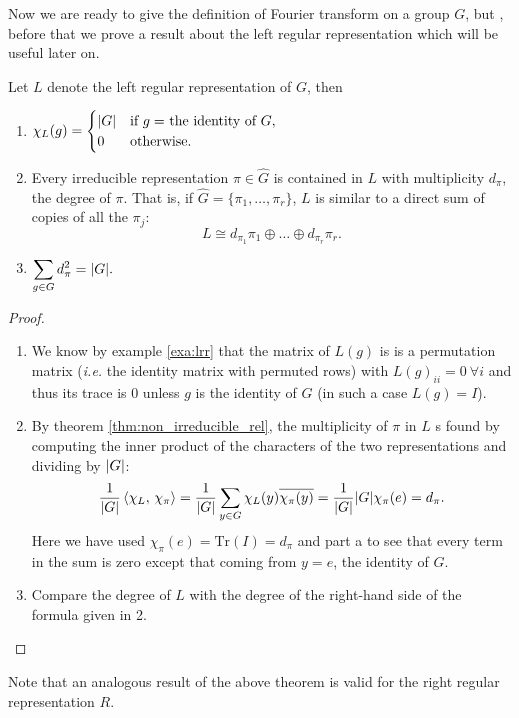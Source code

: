 Now we are ready to give the definition of Fourier transform on a group $G$, but , before that we prove a result about the left regular representation which will be useful later on.
\begin{lemma}
\label{lemma:lrr}
Let $L$ denote the left regular representation of $G$, then
\begin{enumerate}
\item $\displaystyle
\chi_{L}(g)=
\begin{cases}
\lvert G\rvert &\text{if $g=$ the identity of $G$},\\
0	   &\text{otherwise}.
\end{cases}
$
\item Every irreducible representation $\pi \in \hat{G}$ is contained in $L$ with multiplicity $d_\pi$, the degree of $\pi$. That is, if $\hat{G}=\{\pi_1,\dots ,\pi_r\}$, $L$ is similar to a direct sum of copies of all the  $\pi_j$:
\[
L\cong d_{\pi_1}\pi_1\oplus\dots\oplus d_{\pi_r}\pi_r.
\]
\item $\displaystyle\sum_{g\in G}d_{\pi}^2=\lvert G\rvert.$	
\end{enumerate}
\end{lemma}  
\begin{proof}
\begin{enumerate}
\item We know by example \ref{exa:lrr} that the matrix of $L(g)$ is  is a permutation matrix (\emph{i.e.} the identity matrix with permuted rows) with $L(g)_{ii}=0 \ \forall i$ and thus its trace is 0 unless $g$ is the identity of $G$ (in such a case $L(g)=I$).
\item By theorem \ref{thm:non_irreducible_rel}, the multiplicity of $\pi$ in $L$ s found by computing the inner product  of  the  characters  of  the  two  representations  and  dividing  by $\lvert G\rvert$:
\[
\frac{1}{\lvert G\rvert}\braket{\chi_L,\, \chi_\pi}=\frac{1}{\lvert G\rvert}\sum_{y \in G}\chi_L(y) \overline{\chi_\pi(y)}=\frac{1}{\lvert G\rvert}\lvert G\rvert \chi_\pi(e)=d_\pi.
\]
Here we have used $\chi_\pi(e)=\text{Tr$(I)=d_\pi$}$ and  part  a to  see that  every  term  in  the  sum is  zero  except
that coming from $y=e$, the identity of $G$.
\item Compare the degree of $L$ with the degree of the right-hand side of the formula given in 2.
 

\end{enumerate}
\end{proof}
Note that an analogous result of the above theorem is valid for the right regular representation $R$.
